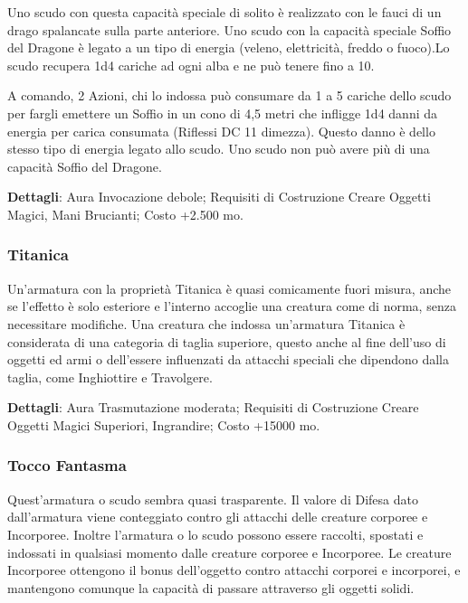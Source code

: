 \begin{multicols}{2}
Uno scudo con questa capacità speciale di solito è realizzato con le fauci di un drago spalancate sulla parte anteriore. Uno scudo con la capacità speciale Soffio del Dragone è legato a un tipo di energia (veleno, elettricità, freddo o fuoco).Lo scudo recupera 1d4 cariche ad ogni alba e ne può tenere fino a 10.

A comando, 2 Azioni, chi lo indossa può consumare da 1 a 5 cariche dello scudo per fargli emettere un Soffio in un cono di 4,5 metri che infligge 1d4 danni da energia per carica consumata (Riflessi DC 11 dimezza). Questo danno è dello stesso tipo di energia legato allo scudo. Uno scudo non può avere più di una capacità Soffio del Dragone.

\textbf{Dettagli}: Aura Invocazione debole; Requisiti di Costruzione Creare Oggetti Magici, Mani Brucianti; Costo +2.500 mo.

\subsubsection*{Titanica}

Un'armatura con la proprietà Titanica è quasi comicamente fuori misura, anche se l'effetto è solo esteriore e l'interno accoglie una creatura come di norma, senza necessitare modifiche. Una creatura che indossa un'armatura Titanica è considerata di una categoria di taglia superiore, questo anche al fine dell'uso di oggetti ed armi o dell'essere influenzati da attacchi speciali che dipendono dalla taglia, come Inghiottire e Travolgere.

\textbf{Dettagli}: Aura Trasmutazione moderata; Requisiti di Costruzione Creare Oggetti Magici Superiori, Ingrandire; Costo +15000 mo.

\subsubsection*{Tocco Fantasma}

Quest'armatura o scudo sembra quasi trasparente. Il valore di Difesa dato dall'armatura viene conteggiato contro gli attacchi delle creature corporee e Incorporee. Inoltre l'armatura o lo scudo possono essere raccolti, spostati e indossati in qualsiasi momento dalle creature corporee e Incorporee. Le creature Incorporee ottengono il bonus dell'oggetto contro attacchi corporei e incorporei, e mantengono comunque la capacità di passare attraverso gli oggetti solidi.


\end{multicols}

